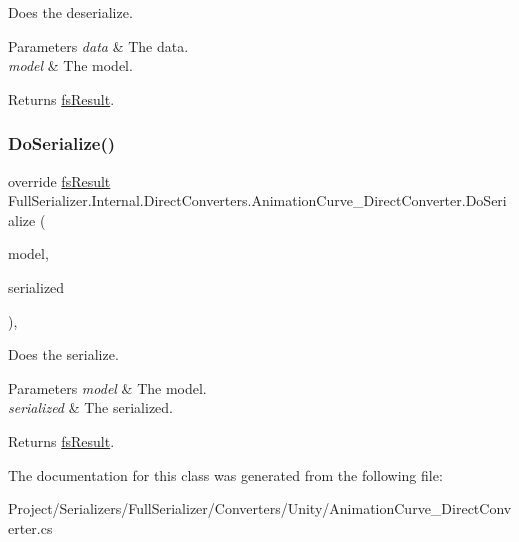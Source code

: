 Does the deserialize. 


\begin{DoxyParams}{Parameters}
{\em data} & The data.\\
\hline
{\em model} & The model.\\
\hline
\end{DoxyParams}
\begin{DoxyReturn}{Returns}
\hyperlink{struct_full_serializer_1_1fs_result}{fs\+Result}.
\end{DoxyReturn}
\mbox{\label{class_full_serializer_1_1_internal_1_1_direct_converters_1_1_animation_curve___direct_converter_a1459e59a56a0729f37ec9cf9ced6cde9}} 
\subsubsection{\texorpdfstring{Do\+Serialize()}{DoSerialize()}}
{\footnotesize\ttfamily override \hyperlink{struct_full_serializer_1_1fs_result}{fs\+Result} Full\+Serializer.\+Internal.\+Direct\+Converters.\+Animation\+Curve\+\_\+\+Direct\+Converter.\+Do\+Serialize (\begin{DoxyParamCaption}\item[{Animation\+Curve}]{model,  }\item[{Dictionary$<$ string, \hyperlink{class_full_serializer_1_1fs_data}{fs\+Data} $>$}]{serialized }\end{DoxyParamCaption})\hspace{0.3cm}{\ttfamily [inline]}, {\ttfamily [protected]}}



Does the serialize. 


\begin{DoxyParams}{Parameters}
{\em model} & The model.\\
\hline
{\em serialized} & The serialized.\\
\hline
\end{DoxyParams}
\begin{DoxyReturn}{Returns}
\hyperlink{struct_full_serializer_1_1fs_result}{fs\+Result}.
\end{DoxyReturn}


The documentation for this class was generated from the following file\+:\begin{DoxyCompactItemize}
\item 
Project/\+Serializers/\+Full\+Serializer/\+Converters/\+Unity/Animation\+Curve\+\_\+\+Direct\+Converter.\+cs\end{DoxyCompactItemize}
